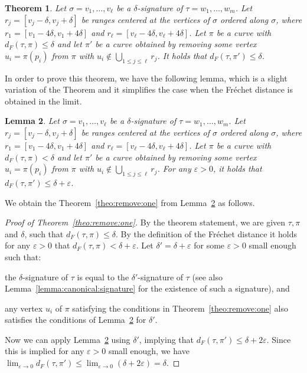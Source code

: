 \documentclass[11pt, letter]{article}
\newtheorem{theorem}{Theorem}[section]
\newtheorem{lemma}[theorem]{Lemma}
\newcommand{\thmlab}[1]{{\label{theo:#1}}}
\newcommand{\thmref}[1]{Theorem~\ref{theo:#1}}
\newcommand{\lemlab}[1]{\label{lemma:#1}}
\newcommand{\lemref}[1]{Lemma~\ref{lemma:#1}}
\newcommand{\Frechet}{Fr\'echet\xspace}
\providecommand{\eps}{{\varepsilon}}\newcommand{\Astop}{\overline{a}}
\providecommand{\pth}[2][\!]{#1\left({#2}\right)}
\newcommand{\lenClusters}{\ensuremath{\ell}}
\newcommand{\distFr}[2]{\ensuremath{d_F\pth{#1,#2}}}
\begin{document}
\begin{theorem}\thmlab{remove:one}
Let $\sigma=v_1,\dots,v_\lenClusters$ be a $\delta$-signature of $\tau=w_1,\dots,w_m$.
Let $r_j=[v_j-\delta,v_j+\delta]$ be ranges centered at the vertices of $\sigma$
ordered along $\sigma$, where $r_1=[v_1-4\delta,v_1+4\delta]$ and
$r_\lenClusters=[v_\lenClusters-4\delta,v_\lenClusters+4\delta]$. Let $\pi$ be a curve with
$\distFr{\tau}{\pi} \leq \delta$ and let $\pi'$ be a curve obtained by removing 
some vertex $u_i=\pi(p_i)$ from $\pi$ with $u_i \notin \bigcup_{1\leq j \leq \lenClusters} r_j$. 
It holds that $\distFr{\tau}{\pi'} \leq \delta$. 
\end{theorem}

In order to prove this theorem, we have the following lemma, which is a slight variation of the Theorem and it simplifies the case when the \Frechet distance is obtained in the limit.


\begin{lemma}\lemlab{remove:one}
Let $\sigma=v_1,\dots,v_\lenClusters$ be a $\delta$-signature of $\tau=w_1,\dots,w_m$.
Let $r_j=[v_j-\delta,v_j+\delta]$ be ranges centered at the vertices of $\sigma$
ordered along $\sigma$, where $r_1=[v_1-4\delta,v_1+4\delta]$ and
$r_\lenClusters=[v_\lenClusters-4\delta,v_\lenClusters+4\delta]$. Let $\pi$ be a curve with
$\distFr{\tau}{\pi} <\delta$ and let $\pi'$ be a curve obtained by removing 
some vertex $u_i=\pi(p_i)$ from $\pi$ with $u_i \notin \bigcup_{1\leq j \leq \lenClusters} r_j$. 
For any $\eps>0$, it holds that $\distFr{\tau}{\pi'} \leq \delta+\eps$. 
\end{lemma}

We obtain the \thmref{remove:one} from \lemref{remove:one} as follows. 
\begin{proof}[Proof of \thmref{remove:one}]
By the theorem statement, we are given $\tau,\pi$ and $\delta$, such that 
$\distFr{\tau}{\pi} \leq \delta$. By the definition of the \Frechet distance
 it holds for any $\eps > 0$ that $\distFr{\tau}{\pi} < \delta+\eps$. 
Let $\delta'=\delta+\eps$ for some $\eps>0$ small enough such that: 
\begin{compactenum}[(i)]
\item the $\delta$-signature of $\tau$ is equal to the $\delta'$-signature of $\tau$ (see also \lemref{canonical:signature} for the existence of such a signature), and
\item any vertex $u_i$ of $\pi$ satisfying the conditions in \thmref{remove:one} also 
satisfies the conditions of \lemref{remove:one} for $\delta'$.
\end{compactenum}
Now we can apply \lemref{remove:one} using $\delta'$, implying that $\distFr{\tau}{\pi'} \leq \delta+2\eps$.
Since this is implied for any $\eps > 0$ small enough, we have
$\lim_{\eps \rightarrow 0} \distFr{\tau}{\pi'} 
\leq \lim_{\eps\rightarrow 0} \left( \delta+2\eps \right) = \delta$. 
\end{proof}
\end{document}
